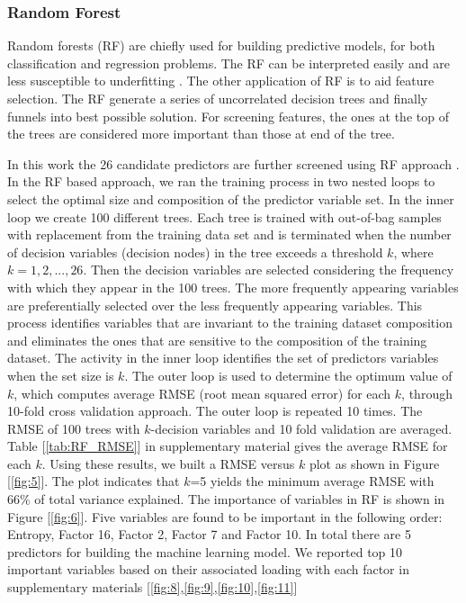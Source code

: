 \documentclass[preprint,12pt]{elsarticle}
\begin{document}
\subsubsection{Random Forest}
Random forests (RF) are chiefly used for building predictive models, for both classification and regression problems. The RF can be interpreted easily and are less susceptible to underfitting \citep{genuer2010variable}. The other application of RF is to aid feature selection. The RF generate a series of uncorrelated decision trees and finally funnels into best possible solution. For screening features, the ones at the top of the trees are considered more important than those at end of the tree.
\par
In this work the 26 candidate predictors are further screened using RF approach \cite{genuer2010variable}. In the RF based approach, we ran the training process in two nested loops to select the optimal size and composition of the predictor variable set. In the inner loop we create 100 different trees. Each tree is trained with out-of-bag samples with replacement from the training data set and is terminated when the number of decision variables (decision nodes) in the tree exceeds a threshold $k$, where $k = 1, 2, ..., 26$. Then the decision variables are selected considering the frequency with which they appear in the 100 trees. The more frequently appearing variables are preferentially selected over the less frequently appearing variables. This process identifies variables that are invariant to the training dataset composition and eliminates the ones that are sensitive to the composition of the training dataset. The activity in the inner loop identifies the set of predictors variables when the set size is $k$. The outer loop is used to determine the optimum value of $k$, which computes average RMSE (root mean squared error) for each $k$, through 10-fold cross validation approach. The outer loop is repeated 10 times. The RMSE of 100 trees with $k$-decision variables and 10 fold validation are averaged. Table [\ref{tab:RF_RMSE}] in supplementary material gives the average RMSE for each $k$. Using these results, we built a RMSE versus $k$ plot as shown in Figure [\ref{fig:5}]. The plot indicates that $k$=5 yields the minimum average RMSE with 66\% of total variance explained. The importance of variables in RF is shown in Figure [\ref{fig:6}]. Five variables are found to be important in the following order: Entropy, Factor 16, Factor 2, Factor 7 and Factor 10. In total there are 5 predictors for building the machine learning model. We reported top 10 important variables based on their associated loading with each factor in supplementary materials [\ref{fig:8},\ref{fig:9},\ref{fig:10},\ref{fig:11}]
\end{document}
